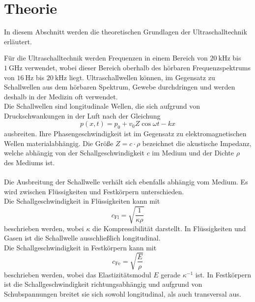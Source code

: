 \section{Theorie}
\label{sec:theorie}

    In diesem Abschnitt werden die theoretischen Grundlagen der Ultraschalltechnik erläutert.

    Für die Ultraschalltechnik werden Frequenzen in einem Bereich von $\SI{20}{\kilo\hertz}$ bis $\SI{1}{\giga\hertz}$ verwendet,
    wobei dieser Bereich oberhalb des hörbaren Frequenzspektrums von $\SI{16}{\hertz}$ bis $\SI{20}{\kilo\hertz}$ liegt.
    Ultraschallwellen können,
    im Gegensatz zu Schallwellen aus dem hörbaren Spektrum,
    Gewebe durchdringen und werden deshalb in der Medizin oft verwendet.\\
    Die Schallwellen sind longitudinale Wellen,
    die sich aufgrund von Druckschwankungen in der Luft nach der Gleichung
    \begin{equation}
        p(x,t) = p_0 + v_0 Z \cos{\omega t - kx}
    \end{equation}
    ausbreiten.
    Ihre Phasengeschwindigkeit ist im Gegensatz zu elektromagnetischen Wellen materialabhängig.
    Die Größe $Z = c \cdot \rho$ bezeichnet die akustische Impedanz,
    welche abhängig von der Schallgeschwindigkeit $c$ im Medium und der Dichte $\rho$ des Mediums ist.\\
    \\
    Die Ausbreitung der Schallwelle verhält sich ebenfalls abhängig vom Medium.
    Es wird zwischen Flüssigkeiten und Festkörpern unterschieden.\\
    Die Schallgeschwindigkeit in Flüssigkeiten kann mit 
    \begin{equation}
        c_\text{Fl} = \sqrt{\frac{1}{\kappa \rho}}
        \label{eqn:schallgeschwindigkeit_flüssigkeit}
    \end{equation}
    beschrieben werden,
    wobei $\kappa$ die Kompressibilität darstellt.
    In Flüssigkeiten und Gasen ist die Schallwelle ausschließlich longitudinal.\\
    Die Schallgeschwindigkeit in Festkörpern kann mit 
    \begin{equation}
        c_\text{Fe} = \sqrt{\frac{E}{\rho}}
        \label{eqn:schallgeschwindigkeit_festkörper}
    \end{equation}
    beschrieben werden,
    wobei das Elastizitätsmodul $E$ gerade $\kappa^{-1}$ ist.
    In Festkörpern ist die Schallgeschwindigkeit richtungsabhängig und aufgrund von Schubspannungen breitet sie sich sowohl longitudinal,
    als auch transversal aus.

